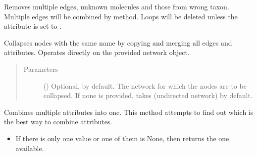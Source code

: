 \documentclass[letterpaper,10pt,english]{sphinxmanual}
\begin{document}
\begin{fulllineitems}
\begin{fulllineitems}
\label{\detokenize{main:pypath.main.PyPath.clean_graph}}
Removes multiple edges, unknown molecules and those from wrong
taxon. Multiple edges will be combined by
{\hyperref[\detokenize{main:pypath.main.PyPath.combine_attr}]{}} method.
Loops will be deleted unless the attribute
 is set to .

\end{fulllineitems}


\begin{fulllineitems}
\label{\detokenize{main:pypath.main.PyPath.collapse_by_name}}
Collapses nodes with the same name by copying and merging
all edges and attributes. Operates directly on the provided
network object.
\begin{quote}\begin{description}
\item[{Parameters}] \leavevmode
{} () \textendash{} Optional,  by default. The network for which the
nodes are to be collapsed. If none is provided, takes
 (undirected network) by
default.

\end{description}\end{quote}

\end{fulllineitems}


\begin{fulllineitems}
\label{\detokenize{main:pypath.main.PyPath.combine_attr}}
Combines multiple attributes into one. This method attempts
to find out which is the best way to combine attributes.
\begin{itemize}
\item {} 
If there is only one value or one of them is None, then
returns the one available.


\end{itemize}
\end{fulllineitems}
\end{fulllineitems}
\end{document}
